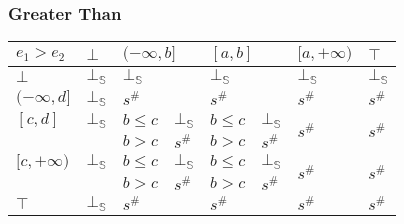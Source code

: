 \documentclass{beamer}
\begin{document}
        \begin{frame}
            \frametitle{Greater Than}
    \begin{table}[]
        \begin{tabular}{|l|l|ll|ll|l|l|}
        \hline
        $e_1 > e_2$    & $\bot$ & \multicolumn{2}{l|}{$(-\infty, b]$} & \multicolumn{2}{l|}{$[a, b]$} & $[a, +\infty)$          & $\top$                  \\ \hline
        $\bot$         & $\bot_\mathbb{S}$ & \multicolumn{2}{l|}{$\bot_\mathbb{S}$}         & \multicolumn{2}{l|}{$\bot_\mathbb{S}$}   & $\bot_\mathbb{S}$                  & $\bot_\mathbb{S}$                  \\ \hline
        $(-\infty, d]$ & $\bot_\mathbb{S}$ & \multicolumn{2}{l|}{$s^\#$}         & \multicolumn{2}{l|}{$s^\#$}   & $s^\#$                  & $s^\#$                  \\ \hline
        $[c, d]$       & $\bot_\mathbb{S}$ & $b \le c$          & $\bot_\mathbb{S}$         & $b \le c$       & $\bot_\mathbb{S}$      & \multirow{2}{*}{$s^\#$} & \multirow{2}{*}{$s^\#$} \\
                        &        & $b > c$            & $s^\#$         & $b > c$         & $s^\#$      &                         &                         \\ \hline
        $[c, +\infty)$ & $\bot_\mathbb{S}$ & $b \le c$          & $\bot_\mathbb{S}$         & $b \le c$       & $\bot_\mathbb{S}$      & \multirow{2}{*}{$s^\#$} & \multirow{2}{*}{$s^\#$} \\
                        &        & $b > c$            & $s^\#$         & $b > c$         & $s^\#$      &                         &                         \\ \hline
        $\top$         & $\bot_\mathbb{S}$ & \multicolumn{2}{l|}{$s^\#$}         & \multicolumn{2}{l|}{$s^\#$}   & $s^\#$                  & $s^\#$                  \\ \hline
        \end{tabular}
        \end{table}
    \end{frame}
    
\end{document}
